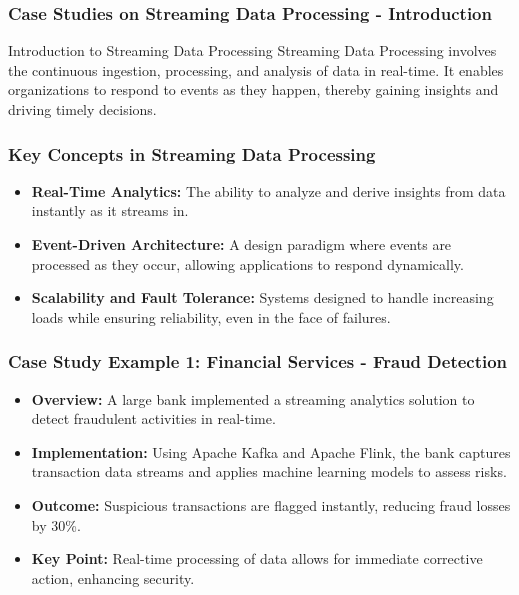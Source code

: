 \documentclass[aspectratio=169]{beamer}
\begin{document}
\begin{frame}[fragile]
    \frametitle{Case Studies on Streaming Data Processing - Introduction}
    \begin{block}{Introduction to Streaming Data Processing}
        Streaming Data Processing involves the continuous ingestion, processing, and analysis of data in real-time. It enables organizations to respond to events as they happen, thereby gaining insights and driving timely decisions.
    \end{block}
\end{frame}

\begin{frame}[fragile]
    \frametitle{Key Concepts in Streaming Data Processing}
    \begin{itemize}
        \item \textbf{Real-Time Analytics:} The ability to analyze and derive insights from data instantly as it streams in.
        \item \textbf{Event-Driven Architecture:} A design paradigm where events are processed as they occur, allowing applications to respond dynamically.
        \item \textbf{Scalability and Fault Tolerance:} Systems designed to handle increasing loads while ensuring reliability, even in the face of failures.
    \end{itemize}
\end{frame}

\begin{frame}[fragile]
    \frametitle{Case Study Example 1: Financial Services - Fraud Detection}
    \begin{itemize}
        \item \textbf{Overview:} A large bank implemented a streaming analytics solution to detect fraudulent activities in real-time.
        \item \textbf{Implementation:} Using Apache Kafka and Apache Flink, the bank captures transaction data streams and applies machine learning models to assess risks.
        \item \textbf{Outcome:} Suspicious transactions are flagged instantly, reducing fraud losses by 30\%.
        \item \textbf{Key Point:} Real-time processing of data allows for immediate corrective action, enhancing security.
    \end{itemize}
\end{frame}
\end{document}

